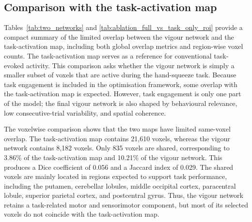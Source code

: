\documentclass[utf8]{frontiers_suppmat}
\begin{document}
\subsection{Comparison with the task-activation map}
Tables~\ref{tab:two_networks} and \ref{tab:ablation_full_vs_task_only_roi} provide a compact summary of the limited overlap between the vigour network and the task-activation map, including both global overlap metrics and region-wise voxel counts. The task-activation map serves as a reference for conventional task-evoked activity. This comparison asks whether the vigour network is simply a smaller subset of voxels that are active during the hand-squeeze task. Because task engagement is included in the optimisation framework, some overlap with the task-activation map is expected. However, task engagement is only one part of the model; the final vigour network is also shaped by behavioural relevance, low consecutive-trial variability, and spatial coherence.

The voxelwise comparison shows that the two maps have limited same-voxel overlap. The task-activation map contains 21,610 voxels, whereas the vigour network contains 8,182 voxels. Only 835 voxels are shared, corresponding to 3.86\% of the task-activation map and 10.21\% of the vigour network. This produces a Dice coefficient of 0.056 and a Jaccard index of 0.029. The shared voxels are mainly located in regions expected to support task performance, including the putamen, cerebellar lobules, middle occipital cortex, paracentral lobule, superior parietal cortex, and postcentral gyrus. Thus, the vigour network retains a task-related motor and sensorimotor component, but most of its selected voxels do not coincide with the task-activation map.
\end{document}
